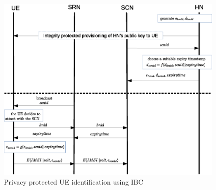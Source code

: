 \documentclass[lnicst,sechang,a4paper]{svmultln}
\begin{document}
\begin{figure}
\begin{center}
  \includegraphics[width=.98\textwidth]{solution_based_on_ibc1.eps}
\caption{Privacy protected UE identification using IBC}
\label{fig:solution_ibc}       %
\end{center}
\end{figure}





\end{document}
